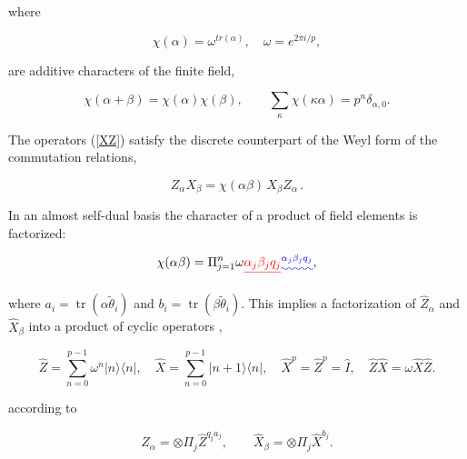 \documentclass[quantumrep,article,submit,pdftex,moreauthors]{Definitions/mdpi}
\DeclareMathOperator{\tr}{tr}
\providecommand{\DIFadd}[1]{{\protect\color{blue}\uwave{#1}}} %
\providecommand{\DIFdel}[1]{{\protect\color{red}\sout{#1}}}                      %
\providecommand{\DIFaddbegin}{} %
\providecommand{\DIFaddend}{} %
\providecommand{\DIFdelbegin}{} %
\providecommand{\DIFdelend}{} %
\begin{document}
where

\begin{equation*}
  \chi \left( \alpha \right)
  = \omega^{tr\left( \alpha \right)},
  \quad \omega = e^{2\pi i / p},
\end{equation*}

are additive characters of the finite field,

\begin{equation*}
  \chi\left( \alpha+\beta \right)
  = \chi\left( \alpha \right) \chi\left( \beta \right),
  \qquad \sum_{\kappa }\chi\left( \kappa\alpha \right)
  = p^{n}\delta_{\alpha,0}.
\end{equation*}

The operators (\ref{XZ}) satisfy the discrete counterpart of the Weyl form of
the commutation relations,

\begin{equation}
  Z_{\alpha} X_{\beta }
  = \chi \left( \alpha\beta \right) \, X_{\beta }Z_{\alpha}\,.
  \label{commutation_relation}
\end{equation}

In an almost self-dual basis the character of a product of field elements is
factorized:

\begin{equation}
  \chi\left( \alpha\beta \right)
  = \Pi_{j=1}^{n} \omega\DIFdelbegin %
\DIFdel{\alpha_{j}\beta _{j}q_{j}}%
\DIFdelend \DIFaddbegin \DIFadd{^{\alpha_{j}\beta_{j}q_{j}}}\DIFaddend ,
  \label{chi fact}
\end{equation}

where $a_{i}=\tr(\alpha\tilde{\theta}_{i})$ and $b_{i} =
\tr(\beta\tilde{\theta}_{i})$. This implies a factorization of
$\hat{Z}_{\alpha}$ and $\hat{X}_{\beta }$ into a product of cyclic operators
\cite{Schwinger1,Schwinger2},

\begin{equation}
  \hat{Z}
  = \sum_{n=0}^{p-1} \omega^{n} |n\rangle \langle n|, \quad \hat{X}
  = \sum_{n=0}^{p-1} |n+1\rangle \langle n|,
  \quad \hat{X}^{p} = \hat{Z}^{p} = \hat{I},
  \quad \hat{Z}\hat{X} = \omega \hat{X}\hat{Z}.
\end{equation}

according to

\begin{equation}
  \hat{Z}_{\alpha}
  = \otimes \Pi_{j}\hat{Z}^{q_{j}a_{j}},
  \qquad \hat{X}_{\beta}
  = \otimes \Pi_{j}\hat{X}^{b_{j}}.
  \label{ZXq}
\end{equation}
\end{document}
